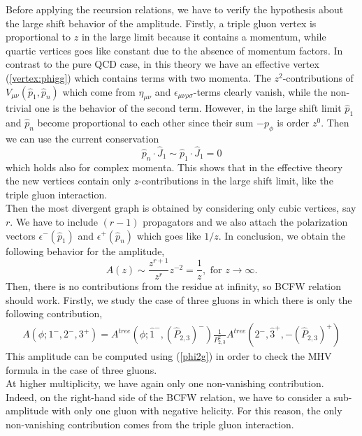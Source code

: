 Before applying the recursion relations, we have to verify the hypothesis about the large shift behavior of the amplitude. Firstly, a triple gluon vertex is proportional to $z$ in the large limit because it contains a momentum, while quartic vertices goes like constant due to the absence of momentum factors. In contrast to the pure QCD case, in this theory we have an effective vertex (\ref{vertex:phigg}) which contains terms with two momenta. The $z^2$-contributions of $V_{\mu\nu}(\hat p_1, \hat p_n)$ which come from $\eta_{\mu\nu}$ and $\epsilon_{\mu\nu\rho\sigma}$-terms clearly vanish, while the non-trivial one is the behavior of the second term. However, in the large shift limit $\hat p_1$ and $\hat p_n$ become proportional to each other since their sum $-p_\phi$ is order $z^0$. Then we can use the current conservation $$\hat p_n \cdot \hat J_1 \sim \hat p_1 \cdot \hat J_1=0$$ which holds also for complex momenta. This shows that in the effective theory the new vertices contain only $z$-contributions in the large shift limit, like the triple gluon interaction.\\
Then the most divergent graph is obtained by considering only cubic vertices, say $r$. We have to include $(r-1)$ propagators and we also attach the polarization vectors $\epsilon^-(\hat p_1)$ and $\epsilon^+(\hat p_n)$ which goes like $1/z$. In conclusion, we obtain the following behavior for the amplitude,
$$
	A(z)\sim \frac{z^{r+1}}{z^r} z^{-2}=\frac{1}{z}, \text{ for }z\rightarrow \infty.
$$
Then, there is no contributions from the residue at infinity, so BCFW relation should work. Firstly, we study the case of three gluons in which there is only the following contribution, 
\begin{align*}
	A(\phi;1^-,2^-,3^+)=A^{tree}(\phi;\hat 1^-, (\hat P_{2,3})^-)\frac{1}{P_{2,3}^2} A^{tree}(2^-,\hat 3^+, -(\hat P_{2,3})^+)
\end{align*}
This amplitude can be computed using (\ref{phi2g}) in order to check the MHV formula in the case of three gluons.\\
At higher multiplicity, we have again only one non-vanishing contribution. Indeed, on the right-hand side of the BCFW relation, we have to consider a sub-amplitude with only one gluon with negative helicity. For this reason, the only non-vanishing contribution comes from the triple gluon interaction.
